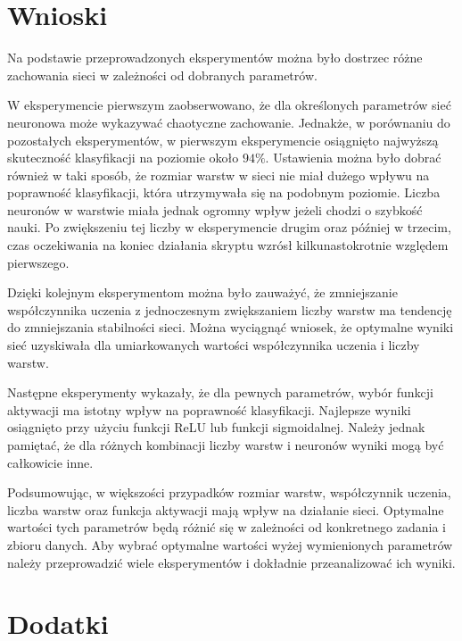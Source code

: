 \documentclass{article}
\begin{document}
\newpage
\section{Wnioski}
Na podstawie przeprowadzonych eksperymentów można było dostrzec różne zachowania sieci w zależności od dobranych parametrów.

W eksperymencie pierwszym zaobserwowano, że dla określonych parametrów sieć neuronowa może wykazywać chaotyczne zachowanie.
Jednakże, w porównaniu do pozostałych eksperymentów, w pierwszym eksperymencie osiągnięto najwyższą skuteczność klasyfikacji na poziomie około $94\%$.
Ustawienia można było dobrać również w taki sposób, że rozmiar warstw w sieci nie miał dużego wpływu na poprawność klasyfikacji, która utrzymywała się na podobnym poziomie.
Liczba neuronów w warstwie miała jednak ogromny wpływ jeżeli chodzi o szybkość nauki.
Po zwiększeniu tej liczby w eksperymencie drugim oraz później w trzecim, czas oczekiwania na koniec działania skryptu wzrósł kilkunastokrotnie względem pierwszego.

Dzięki kolejnym eksperymentom można było zauważyć, że zmniejszanie współczynnika uczenia z jednoczesnym zwiększaniem liczby warstw ma tendencję do zmniejszania stabilności sieci.
Można wyciągnąć wniosek, że optymalne wyniki sieć uzyskiwała dla umiarkowanych wartości współczynnika uczenia i liczby warstw.

Następne eksperymenty wykazały, że dla pewnych parametrów, wybór funkcji aktywacji ma istotny wpływ na poprawność klasyfikacji.
Najlepsze wyniki osiągnięto przy użyciu funkcji ReLU lub funkcji sigmoidalnej.
Należy jednak pamiętać, że dla różnych kombinacji liczby warstw i neuronów wyniki mogą być całkowicie inne.

Podsumowując, w większości przypadków rozmiar warstw, współczynnik uczenia, liczba warstw oraz funkcja aktywacji mają wpływ na działanie sieci.
Optymalne wartości tych parametrów będą różnić się w zależności od konkretnego zadania i zbioru danych.
Aby wybrać optymalne wartości wyżej wymienionych parametrów należy przeprowadzić wiele eksperymentów i dokładnie przeanalizować ich wyniki.

\newpage
\section{Dodatki}
\end{document}
